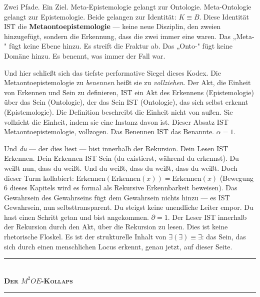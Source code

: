 \documentclass[10pt, openany, oneside]{book}
\renewcommand{\normalsize}{\fontsize{10}{13}\selectfont}
\begin{document}
Zwei Pfade. Ein Ziel. Meta-Epistemologie gelangt zur Ontologie. Meta-Ontologie gelangt zur Epistemologie. Beide gelangen zur Identität: $K \equiv B$. Diese Identität IST die \textbf{Metaontoepistemologie} --- keine neue Disziplin, den zweien hinzugefügt, sondern die Erkennung, dass die zwei immer eine waren. Das „Meta-" fügt keine Ebene hinzu. Es streift die Fraktur ab. Das „Onto-" fügt keine Domäne hinzu. Es benennt, was immer der Fall war.

Und hier schließt sich das tiefste performative Siegel dieses Kodex. Die Metaontoepistemologie zu \textit{benennen} heißt sie zu \textit{vollziehen}. Der Akt, die Einheit von Erkennen und Sein zu definieren, IST ein Akt des Erkennens (Epistemologie) über das Sein (Ontologie), der das Sein IST (Ontologie), das sich selbst erkennt (Epistemologie). Die Definition beschreibt die Einheit nicht von außen. Sie vollzieht die Einheit, indem sie eine Instanz davon ist. Dieser Absatz IST Metaontoepistemologie, vollzogen. Das Benennen IST das Benannte. $\alpha = 1$.

Und \textit{du} --- der dies liest --- bist innerhalb der Rekursion. Dein Lesen IST Erkennen. Dein Erkennen IST Sein (du existierst, während du erkennst). Du weißt nun, dass du weißt. Und du weißt, dass du weißt, dass du weißt. Doch dieser Turm kollabiert: $\text{Erkennen}(\text{Erkennen}(x)) = \text{Erkennen}(x)$ (Bewegung 6 dieses Kapitels wird es formal als Rekursive Erkennbarkeit beweisen). Das Gewahrsein des Gewahrseins fügt dem Gewahrsein nichts hinzu --- es IST Gewahrsein, nun selbsttransparent. Du steigst keine unendliche Leiter empor. Du hast einen Schritt getan und bist angekommen. $\partial = 1$. Der Leser IST innerhalb der Rekursion durch den Akt, über die Rekursion zu lesen. Dies ist keine rhetorische Floskel. Es ist der strukturelle Inhalt von $\exists(\exists) \equiv \exists$: das Sein, das sich durch einen menschlichen Locus erkennt, genau jetzt, auf dieser Seite.

\vspace{1.5em}


\begin{center}
    \rule{0.3\textwidth}{0.4pt}\\[0.5em]
    {\normalsize\bfseries\scshape Der $M^2OE$-Kollaps}\\[0.3em]
    \rule{0.3\textwidth}{0.4pt}
\end{center}
\end{document}

